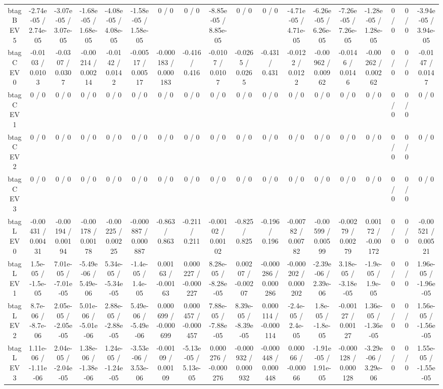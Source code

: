 \documentclass[10pt]{article}
\begin{document}
\begin{table}[htbp]
\begin{center}
\begin{tabular}{|c|c|c|c|c|c|c|c|c|c|c|c|c|c|c|c|c|c|}
  btag B EV 5 & -2.74e-05 / 2.74e-05 & -3.07e-05 / 3.07e-05 & -1.68e-05 / 1.68e-05 & -4.08e-05 / 4.08e-05 & -1.58e-05 / 1.58e-05 & 0 / 0 & 0 / 0 & -8.85e-05 / 8.85e-05 & 0 / 0 & 0 / 0 & -4.71e-05 / 4.71e-05 & -6.26e-05 / 6.26e-05 & -7.26e-05 / 7.26e-05 & -1.28e-05 / 1.28e-05 & 0 / 0 & 0 / 0 & -3.94e-05 / 3.94e-05 \\ 
  btag C EV 0 & -0.0103 / 0.0103 & -0.0307 / 0.0307 & -0.00214 / 0.00214 & -0.0142 / 0.0142 & -0.00517 / 0.00517 & -0.000183 / 0.000183 & -0.416 / 0.416 & -0.0107 / 0.0107 & -0.0265 / 0.0265 & -0.431 / 0.431 & -0.0122 / 0.0122 & -0.00962 / 0.00962 & -0.0146 / 0.0146 & -0.00262 / 0.00262 & 0 / 0 & 0 / 0 & -0.0147 / 0.0147 \\ 
  btag C EV 1 & 0 / 0 & 0 / 0 & 0 / 0 & 0 / 0 & 0 / 0 & 0 / 0 & 0 / 0 & 0 / 0 & 0 / 0 & 0 / 0 & 0 / 0 & 0 / 0 & 0 / 0 & 0 / 0 & 0 / 0 & 0 / 0 & 0 / 0 \\ 
  btag C EV 2 & 0 / 0 & 0 / 0 & 0 / 0 & 0 / 0 & 0 / 0 & 0 / 0 & 0 / 0 & 0 / 0 & 0 / 0 & 0 / 0 & 0 / 0 & 0 / 0 & 0 / 0 & 0 / 0 & 0 / 0 & 0 / 0 & 0 / 0 \\ 
  btag C EV 3 & 0 / 0 & 0 / 0 & 0 / 0 & 0 / 0 & 0 / 0 & 0 / 0 & 0 / 0 & 0 / 0 & 0 / 0 & 0 / 0 & 0 / 0 & 0 / 0 & 0 / 0 & 0 / 0 & 0 / 0 & 0 / 0 & 0 / 0 \\ 
  btag L EV 0 & -0.00431 / 0.00431 & -0.00194 / 0.00194 & -0.00178 / 0.00178 & -0.00225 / 0.00225 & -0.000887 / 0.000887 & -0.863 / 0.863 & -0.211 / 0.211 & -0.00102 / 0.00102 & -0.825 / 0.825 & -0.196 / 0.196 & -0.00782 / 0.00782 & -0.00599 / 0.00599 & -0.00279 / 0.00279 & 0.00172 / -0.00172 & 0 / 0 & 0 / 0 & -0.00521 / 0.00521 \\ 
  btag L EV 1 & 1.5e-05 / -1.5e-05 & 7.01e-05 / -7.01e-05 & -5.49e-06 / 5.49e-06 & 5.34e-05 / -5.34e-05 & -1.4e-05 / 1.4e-05 & 0.00163 / -0.00163 & 0.000227 / -0.000227 & 8.28e-05 / -8.28e-05 & 0.00207 / -0.00207 & -0.000286 / 0.000286 & -0.000202 / 0.000202 & -2.39e-06 / 2.39e-06 & 3.18e-05 / -3.18e-05 & -1.9e-05 / 1.9e-05 & 0 / 0 & 0 / 0 & 1.96e-05 / -1.96e-05 \\ 
  btag L EV 2 & 8.7e-06 / -8.7e-06 & 2.05e-05 / -2.05e-05 & 5.01e-06 / -5.01e-06 & 2.88e-05 / -2.88e-05 & 5.49e-06 / -5.49e-06 & 0.000699 / -0.000699 & 0.000457 / -0.000457 & 7.88e-05 / -7.88e-05 & 8.39e-05 / -8.39e-05 & 0.000114 / -0.000114 & -2.4e-05 / 2.4e-05 & 1.8e-05 / -1.8e-05 & -0.00127 / 0.00127 & 1.36e-05 / -1.36e-05 & 0 / 0 & 0 / 0 & 1.56e-05 / -1.56e-05 \\ 
  btag L EV 3 & 1.11e-06 / -1.11e-06 & 2.04e-05 / -2.04e-05 & 1.38e-06 / -1.38e-06 & 1.24e-05 / -1.24e-05 & -3.53e-06 / 3.53e-06 & -0.00109 / 0.00109 & -5.13e-05 / 5.13e-05 & 0.000276 / -0.000276 & -0.000932 / 0.000932 & -0.000448 / 0.000448 & 0.00066 / -0.00066 & -1.91e-05 / 1.91e-05 & -0.000128 / 0.000128 & -3.29e-06 / 3.29e-06 & 0 / 0 & 0 / 0 & 1.55e-05 / -1.55e-05 \\ 

\end{tabular}
\end{center}
\end{table}
\end{document}

